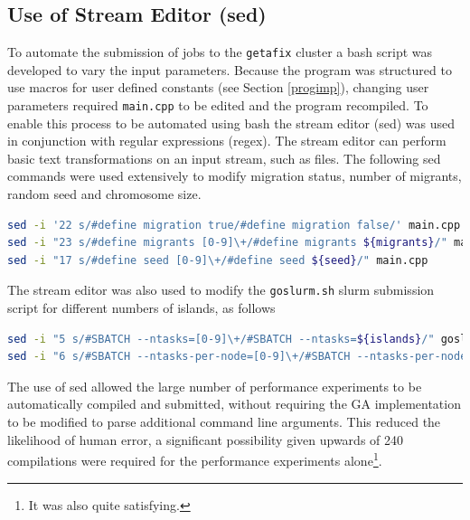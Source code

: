 \documentclass{report}
\begin{document}
\subsection{Use of Stream Editor (sed)}
To automate the submission of jobs to the \texttt{getafix} cluster a bash script was developed to vary the input parameters. Because the program was structured to use macros for user defined constants (see Section \ref{progimp}), changing user parameters required \texttt{main.cpp} to be edited and the program recompiled. To enable this process to be automated using bash the stream editor (sed) was used in conjunction with regular expressions (regex). The stream editor can perform basic text transformations on an input stream, such as files. The following sed commands were used extensively to modify migration status, number of migrants, random seed and chromosome size. 
\begin{lstlisting}[language=bash]
sed -i '22 s/#define migration true/#define migration false/' main.cpp
sed -i "23 s/#define migrants [0-9]\+/#define migrants ${migrants}/" main.cpp
sed -i "17 s/#define seed [0-9]\+/#define seed ${seed}/" main.cpp
\end{lstlisting}
The stream editor was also used to modify the \texttt{goslurm.sh} slurm submission script for different numbers of islands, as follows
\begin{lstlisting}[language=bash]
sed -i "5 s/#SBATCH --ntasks=[0-9]\+/#SBATCH --ntasks=${islands}/" goslurm.sh
sed -i "6 s/#SBATCH --ntasks-per-node=[0-9]\+/#SBATCH --ntasks-per-node=${islands}/" goslurm.sh
\end{lstlisting}

The use of sed allowed the large number of performance experiments to be automatically compiled and submitted, without requiring the GA implementation to be modified to parse additional command line arguments. This reduced the likelihood of human error, a significant possibility given upwards of 240 compilations were required for the performance experiments alone\footnote{It was also quite satisfying.}.
\end{document}

